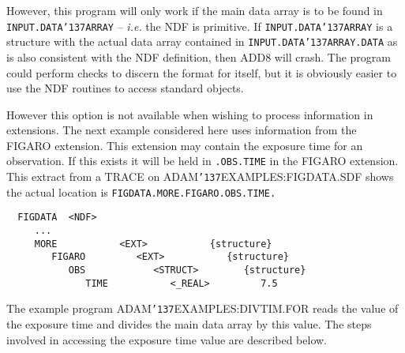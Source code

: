 \documentclass[twoside,11pt]{article}
\renewcommand{\_}{{\tt\char'137}}
\begin{document}
However, this program will only work if the main data array is
to be found in {\tt INPUT.DATA\_ARRAY} --
{\it i.e.} the NDF is primitive. If {\tt INPUT.DATA\_ARRAY} is a structure
with the actual data array contained in {\tt INPUT.DATA\_ARRAY.DATA} as is
also consistent with the NDF definition, then ADD8 will crash.
The program could  perform checks to discern the format for itself, but
it is obviously easier to use the NDF routines to access standard objects.

However this option is not available when wishing to process information in
extensions.
The next example considered here uses information from the FIGARO extension.
This  extension may contain the exposure time for an observation.
If this exists it will be held in {\tt.OBS.TIME} in the FIGARO extension.
This extract from a TRACE on ADAM\_EXAMPLES:FIGDATA.SDF shows the actual
location is {\tt FIGDATA.MORE.FIGARO.OBS.TIME.}
\begin{verbatim}
  FIGDATA  <NDF>
     ...
     MORE           <EXT>           {structure}
        FIGARO         <EXT>           {structure}
           OBS            <STRUCT>        {structure}
              TIME           <_REAL>         7.5
\end{verbatim}
The example program ADAM\_EXAMPLES:DIVTIM.FOR reads the value of the
exposure time and divides the main data array by this value.
The steps involved in accessing the exposure time value are described
below.
\end{document}
